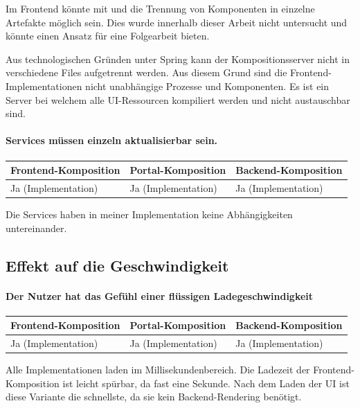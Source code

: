 Im Frontend könnte mit \cite{PolymerHomepage} und \cite{mdnWebComponents} die Trennung von Komponenten in einzelne Artefakte möglich sein. Dies wurde innerhalb dieser Arbeit nicht untersucht und könnte einen Ansatz für eine Folgearbeit bieten.

Aus technologischen Gründen unter Spring kann der Kompositionsserver nicht in verschiedene Files aufgetrennt werden. Aus diesem Grund sind die Frontend-Implementationen nicht unabhängige Prozesse und Komponenten. Es ist ein Server bei welchem alle UI-Ressourcen kompiliert werden und nicht austauschbar sind.

\paragraph{Services müssen einzeln aktualisierbar sein.}

\begin{tabularx}{\linewidth}{| Y | Y | Y |}
    \hline
    Frontend-Komposition & Portal-Komposition & Backend-Komposition
    \\ \hline
    Ja (Implementation) & Ja (Implementation) & Ja (Implementation) 
    \\ \hline
\end{tabularx}

Die Services haben in meiner Implementation keine Abhängigkeiten untereinander.

\subsection{Effekt auf die Geschwindigkeit}

\paragraph{Der Nutzer hat das Gefühl einer flüssigen Ladegeschwindigkeit}

\begin{tabularx}{\linewidth}{| Y | Y | Y |}
    \hline
    Frontend-Komposition & Portal-Komposition & Backend-Komposition
    \\ \hline
    Ja (Implementation) & Ja (Implementation) & Ja (Implementation)
    \\ \hline
\end{tabularx}

Alle Implementationen laden im Millisekundenbereich. Die Ladezeit der Frontend-Komposition ist leicht spürbar, da fast eine Sekunde. Nach dem Laden der \ac{UI} ist diese Variante die schnellste, da sie kein Backend-Rendering benötigt.

